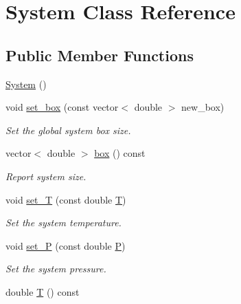 \hypertarget{classSystem}{\section{System Class Reference}
\label{classSystem}
}
\subsection*{Public Member Functions}
\begin{DoxyCompactItemize}
\item 
\hyperlink{classSystem_ae317936c9bcf1374d61745572e0f2f8a}{System} ()
\item 
\hypertarget{classSystem_a866817ee987f092232d425275d5cc349}{void \hyperlink{classSystem_a866817ee987f092232d425275d5cc349}{set\-\_\-box} (const vector$<$ double $>$ new\-\_\-box)}\label{classSystem_a866817ee987f092232d425275d5cc349}

\begin{DoxyCompactList}\small\item\em Set the global system box size. \end{DoxyCompactList}\item 
\hypertarget{classSystem_a1eef18748e84f29b54acc48a6b056047}{vector$<$ double $>$ \hyperlink{classSystem_a1eef18748e84f29b54acc48a6b056047}{box} () const }\label{classSystem_a1eef18748e84f29b54acc48a6b056047}

\begin{DoxyCompactList}\small\item\em Report system size. \end{DoxyCompactList}\item 
\hypertarget{classSystem_aae97ba99bc1cc745216117517f23672a}{void \hyperlink{classSystem_aae97ba99bc1cc745216117517f23672a}{set\-\_\-\-T} (const double \hyperlink{classSystem_a6419f1cf86b2ef66ca44cc3c74b9e5a8}{T})}\label{classSystem_aae97ba99bc1cc745216117517f23672a}

\begin{DoxyCompactList}\small\item\em Set the system temperature. \end{DoxyCompactList}\item 
\hypertarget{classSystem_a12e5fc7a26fa2d106ba0f899ec058b3e}{void \hyperlink{classSystem_a12e5fc7a26fa2d106ba0f899ec058b3e}{set\-\_\-\-P} (const double \hyperlink{classSystem_acd7d6696787afb9b3bfa4197112802fa}{P})}\label{classSystem_a12e5fc7a26fa2d106ba0f899ec058b3e}

\begin{DoxyCompactList}\small\item\em Set the system pressure. \end{DoxyCompactList}\item 
\hypertarget{classSystem_a6419f1cf86b2ef66ca44cc3c74b9e5a8}{double \hyperlink{classSystem_a6419f1cf86b2ef66ca44cc3c74b9e5a8}{T} () const }\label{classSystem_a6419f1cf86b2ef66ca44cc3c74b9e5a8}


\end{DoxyCompactItemize}
